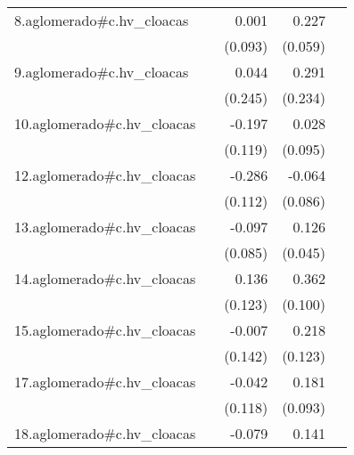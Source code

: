 {\begin{longtable}{l*{4}{D{.}{.}{-1}}}
\addlinespace
8.aglomerado#c.hv\_cloacas&                     &       0.001         &       0.227\sym{***}&                     \\
            &                     &     (0.093)         &     (0.059)         &                     \\
\addlinespace
9.aglomerado#c.hv\_cloacas&                     &       0.044         &       0.291         &                     \\
            &                     &     (0.245)         &     (0.234)         &                     \\
\addlinespace
10.aglomerado#c.hv\_cloacas&                     &      -0.197         &       0.028         &                     \\
            &                     &     (0.119)         &     (0.095)         &                     \\
\addlinespace
12.aglomerado#c.hv\_cloacas&                     &      -0.286\sym{*}  &      -0.064         &                     \\
            &                     &     (0.112)         &     (0.086)         &                     \\
\addlinespace
13.aglomerado#c.hv\_cloacas&                     &      -0.097         &       0.126\sym{**} &                     \\
            &                     &     (0.085)         &     (0.045)         &                     \\
\addlinespace
14.aglomerado#c.hv\_cloacas&                     &       0.136         &       0.362\sym{***}&                     \\
            &                     &     (0.123)         &     (0.100)         &                     \\
\addlinespace
15.aglomerado#c.hv\_cloacas&                     &      -0.007         &       0.218         &                     \\
            &                     &     (0.142)         &     (0.123)         &                     \\
\addlinespace
17.aglomerado#c.hv\_cloacas&                     &      -0.042         &       0.181         &                     \\
            &                     &     (0.118)         &     (0.093)         &                     \\
\addlinespace
18.aglomerado#c.hv\_cloacas&                     &      -0.079         &       0.141\sym{*}  &                     \\

\end{longtable}}
